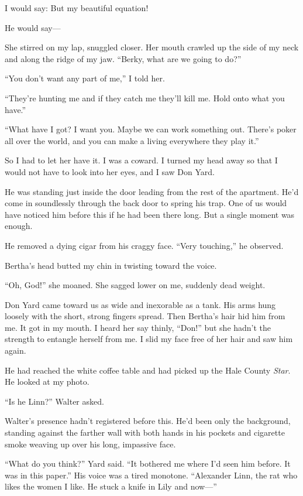 \documentclass{novel}
\begin{document}
I would say: But my beautiful equation!

He would say—

She stirred on my lap, snuggled closer. Her mouth crawled up the side of my neck and along the ridge of my jaw. “Berky, what are we going to do?”

“You don’t want any part of me,” I told her. 

\noindent“They’re hunting me and if they catch me they’ll kill me. Hold onto what you have.”

“What have I got? I want you. Maybe we can work something out. There’s poker all over the world, and you can make a living everywhere they play it.”

So I had to let her have it. I was a coward. I turned my head away so that I would not have to look into her eyes, and I saw Don Yard.

\scenestars

He was standing just inside the door leading from the rest of the apartment. He’d come in soundlessly through the back door to spring his trap. One of us would have noticed him before this if he had been there long. But a single moment was enough.

He removed a dying cigar from his craggy face. “Very touching,” he observed.

Bertha’s head butted my chin in twisting toward the voice.

“Oh, God!” she moaned. She sagged lower on me, suddenly dead weight.

Don Yard came toward us as wide and inexorable as a tank. His arms hung loosely with the short, strong fingers spread. Then Bertha’s hair hid him from me. It got in my mouth. I heard her say thinly, “Don!” but she hadn’t the strength to entangle herself from me. I slid my face free of her hair and saw him again.

He had reached the white coffee table and had picked up the Hale County \textit{Star}. He looked at my photo.

“Is he Linn?” Walter asked.

Walter’s presence hadn’t registered before this. He’d been only the background, standing against the farther wall with both hands in his pockets and cigarette smoke weaving up over his long, impassive face.

“What do you think?” Yard said. “It bothered me where I’d seen him before. It was in this paper.” His voice was a tired monotone. “Alexander Linn, the rat who likes the women I like. He stuck a knife in Lily and now—”
\end{document}
